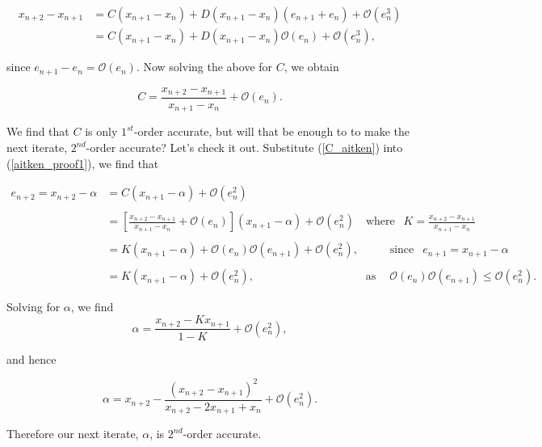 \documentclass[paper=a4, fontsize=11pt]{scrartcl} %
\numberwithin{equation}{section} %
\numberwithin{figure}{section} %
\numberwithin{table}{section} %
\begin{document}
\begin{align*}
x_{n+2}-x_{n+1} &= C(x_{n+1}-x_{n}) +D(x_{n+1}-x_n)(e_{n+1}+e_{n}) + \mathcal{O}(e_{n}^3) \\
	&= C(x_{n+1}-x_{n}) +D(x_{n+1}-x_n)\mathcal{O}(e_{n}) + \mathcal{O}(e_{n}^3),
\end{align*}

since $e_{n+1}-e_{n} = \mathcal{O}(e_{n})$. Now solving the above for $C$, we obtain

\begin{equation}
\label{C_aitken}C = \frac{ x_{n+2}-x_{n+1}  }{ x_{n+1} - x_n } + \mathcal{O}(e_{n}).
\end{equation}

We find that $C$ is only $1^{st}$-order accurate, but will that be enough to to make the next iterate, $2^{nd}$-order accurate? Let's check it out. Substitute (\ref{C_aitken}) into (\ref{aitken_proof1}), we find that

\begin{align*}
e_{n+2} = x_{n+2} - \alpha &= C(x_{n+1}-\alpha) + \mathcal{O}(e_{n}^2) \\ \\
	&= \left[ \frac{x_{n+2}-x_{n+1} }{ x_{n+1} - x_n } + \mathcal{O}(e_{n})    \right]( x_{n+1} - \alpha ) + \mathcal{O}(e_{n}^2) \ \ \ \mbox{ where } \ \ K = \frac{x_{n+2}-x_{n+1} }{ x_{n+1} - x_n }  \\ \\
	&= K(x_{n+1} - \alpha) + \mathcal{O}(e_{n})\mathcal{O}(e_{n+1}) + \mathcal{O}(e_{n}^2),\ \ \ \ \ \ \ \  \ \ \ \mbox{ since } \ \ e_{n+1} = x_{n+1}-\alpha \\ \\
	&= K(x_{n+1} - \alpha) + \mathcal{O}(e_{n}^2),\ \ \ \ \ \ \ \ \ \ \ \ \ \ \ \ \ \ \ \ \ \ \ \ \ \ \ \ \ \ \ \ \ \ \ \ \ \ \ \ \ \ \ \mbox{ as }\ \ \ \	 \mathcal{O}(e_{n})\mathcal{O}(e_{n+1}) \leq \mathcal{O}(e_{n}^2).	
\end{align*}

Solving for $\alpha$, we find 
$$\alpha = \frac{  x_{n+2} - Kx_{n+1} }{ 1 - K } +  \mathcal{O}(e_{n}^2),$$

and hence

$$\alpha = x_{n+2} - \frac{  (x_{n+2}-x_{n+1})^2 }{ x_{n+2} - 2x_{n+1} + x_n } + \mathcal{O}(e_{n}^2).$$

Therefore our next iterate, $\alpha$,  is $2^{nd}$-order accurate.
\end{document}
